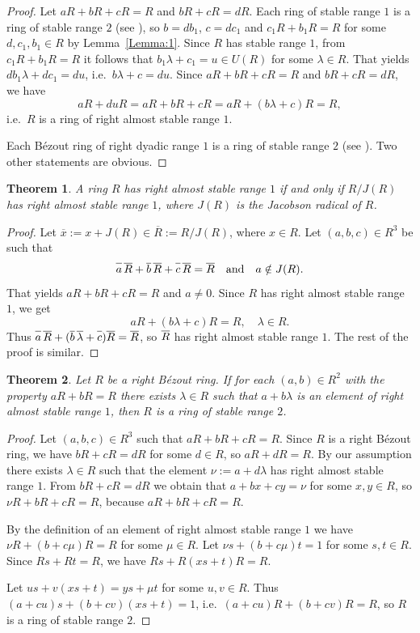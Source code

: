 \documentclass[10pt,a4paper]{amsart}
\theoremstyle{plain}
\newtheorem{theorem}{Theorem}
\theoremstyle{definition}
\begin{document}
\begin{proof}
Let $aR+bR+cR=R$ and $bR+cR=dR$. Each ring of stable range $1$ is a ring of stable range $2$ (see \cite[p.\,14]{1-bass}), so  $b=db_1$, $c=dc_1$ and $c_1R+b_1R=R$ for some $d,c_1,b_1\in R$ by Lemma~\ref{Lemma:1}. Since $R$ has  stable range $1$, from $c_1R+b_1R=R$ it follows that  $b_1\lambda+c_1=u\in U(R)$ for some $\lambda\in R$. That yields $db_1\lambda+dc_1=du$, i.e.~$b\lambda+c=du$. Since $aR+bR+cR=R$ and $bR+cR=dR$, we have
\[
aR+duR=aR+bR+cR=aR+(b\lambda+c)R=R,
\]
i.e.~$R$ is a ring of right almost stable range $1$.

Each B\'ezout ring of right dyadic range $1$ is a ring of stable range $2$ (see  \cite[Theorem~2.1]{3-zabavsky}). Two other statements are obvious.
\end{proof}



\begin{theorem}\label{T:2}
A ring $R$ has  right almost stable range $1$ if and only
if\/ $R/J(R)$ has right almost stable range $1$, where $J(R)$ is the Jacobson radical of\/ $R$.
\end{theorem}
\begin{proof} Let $\overline{x}:=x+J(R)\in \overline{R}:=R/J(R)$, where $x\in R$. Let $(a,b,c)\in R^3$ be such that
\[
\overline{a\vphantom{b}}\,\overline{R\vphantom{b}}+\overline{b}\,\overline{R\vphantom{b}}
+\overline{c\vphantom{b}}\,\overline{R\vphantom{b}}=\overline{R\vphantom{b}}
\quad\text{and}\quad a\notin J(R).
\]
That  yields   $aR+bR+cR=R$ and $a\ne0$. Since $R$ has  right almost stable range $1$, we get
\[
aR+(b\lambda +c)R=R, \quad \lambda\in R.
\]
Thus  $\overline{a\vphantom{b}}\,\overline{R\vphantom{b}}+(\overline{b}\,\overline{\lambda}
+\overline{c\vphantom{b}})\overline{R\vphantom{b}}=\overline{R\vphantom{b}}$,
so   $\overline{R\vphantom{b}}$ has  right almost stable range $1$. The rest of the proof is similar.
\end{proof}

\begin{theorem}\label{T:3}
Let $R$ be a right B\'ezout ring.  If for each  $(a,b)\in R^2$ with the property $aR+bR=R$ there exists
$\lambda\in R$ such that $a+b\lambda$ is an element of right almost stable range $1$, then $R$ is a ring of stable range $2$.
\end{theorem}

\begin{proof}
Let $(a,b,c)\in R^3$ such that $aR+bR+cR=R$. Since $R$ is a right B\'ezout ring, we have $bR+cR=dR$ for some  $d\in R$, so $aR+dR=R$. By our assumption there exists $\lambda\in R$ such that the element  $\nu:=a+d\lambda$  has  right almost stable range $1$.   From  $bR+cR=dR$ we obtain  that $a+bx+cy=\nu$ for some $x,y\in R$, so $\nu R+bR+cR=R$, because   $aR+bR+cR=R$.


By the  definition of an element of   right almost stable range $1$ we have $\nu R+(b+c\mu)R=R$ for some $\mu\in R$. Let $\nu s+(b+c\mu)t=1$ for some $s, t\in R$. Since $Rs+Rt=R$, we have
$Rs+R(xs+t)R=R$.

 Let $us+v(xs+t)=ys+\mu t$ for some $u,v\in R$. Thus
$(a+cu)s+(b+cv)(xs+t)=1$,
i.e.~$(a+cu)R+(b+cv)R=R$, so  $R$ is a ring of stable range $2$.
\end{proof}
\end{document}
